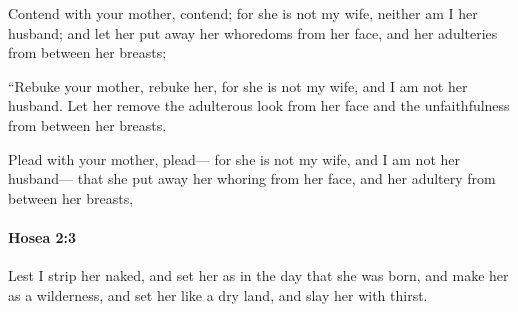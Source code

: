			\begin{versebox}
					\item[BHS] 
					\item[LXX] 
					\item[ASV] Contend with your mother, contend; for she is not my wife, neither am I her husband; and let her put away her whoredoms from her face, and her adulteries from between her breasts;
					\item[NIV] “Rebuke your mother, rebuke her, for she is not my wife, and I am not her husband. Let her remove the adulterous look from her face and the unfaithfulness from between her breasts.
					\item[NRSV] Plead with your mother, plead— for she is not my wife, and I am not her husband— that she put away her whoring from her face, and her adultery from between her breasts,
			\end{versebox}

		\paragraph{Hosea 2:3} %
			\label{HOSEA-2-3}

			Lest I strip her naked, and set her as in the day that she was born, and make her as a wilderness, and set her like a dry land, and slay her with thirst.

